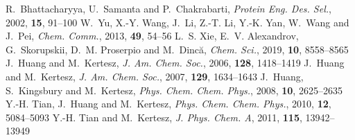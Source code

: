 \documentclass[twoside,twocolumn,9pt]{article}
\begin{document}
\begin{mcitethebibliography}{79}
\EndOfBibitem
{}
R.~Bhattacharyya, U.~Samanta and P.~Chakrabarti, \emph{Protein Eng. Des. Sel.},
  2002, \textbf{15}, 91--100\relax
\mciteBstWouldAddEndPuncttrue
\mciteSetBstMidEndSepPunct{\mcitedefaultmidpunct}
{\mcitedefaultendpunct}{\mcitedefaultseppunct}\relax
\EndOfBibitem
{}
W.~Yu, X.-Y. Wang, J.~Li, Z.-T. Li, Y.-K. Yan, W.~Wang and J.~Pei, \emph{Chem.
  Comm.}, 2013, \textbf{49}, 54--56\relax
\mciteBstWouldAddEndPuncttrue
\mciteSetBstMidEndSepPunct{\mcitedefaultmidpunct}
{\mcitedefaultendpunct}{\mcitedefaultseppunct}\relax
\EndOfBibitem
{}
L.~S. Xie, E.~V. Alexandrov, G.~Skorupskii, D.~M. Proserpio and M.~Dinc\u{a},
  \emph{Chem. Sci.}, 2019, \textbf{10}, 8558--8565\relax
\mciteBstWouldAddEndPuncttrue
\mciteSetBstMidEndSepPunct{\mcitedefaultmidpunct}
{\mcitedefaultendpunct}{\mcitedefaultseppunct}\relax
\EndOfBibitem
{}
J.~Huang and M.~Kertesz, \emph{J. Am. Chem. Soc.}, 2006, \textbf{128},
  1418--1419\relax
\mciteBstWouldAddEndPuncttrue
\mciteSetBstMidEndSepPunct{\mcitedefaultmidpunct}
{\mcitedefaultendpunct}{\mcitedefaultseppunct}\relax
\EndOfBibitem
{}
J.~Huang and M.~Kertesz, \emph{J. Am. Chem. Soc.}, 2007, \textbf{129},
  1634--1643\relax
\mciteBstWouldAddEndPuncttrue
\mciteSetBstMidEndSepPunct{\mcitedefaultmidpunct}
{\mcitedefaultendpunct}{\mcitedefaultseppunct}\relax
\EndOfBibitem
{}
J.~Huang, S.~Kingsbury and M.~Kertesz, \emph{Phys. Chem. Chem. Phys.}, 2008,
  \textbf{10}, 2625--2635\relax
\mciteBstWouldAddEndPuncttrue
\mciteSetBstMidEndSepPunct{\mcitedefaultmidpunct}
{\mcitedefaultendpunct}{\mcitedefaultseppunct}\relax
\EndOfBibitem
{}
Y.-H. Tian, J.~Huang and M.~Kertesz, \emph{Phys. Chem. Chem. Phys.}, 2010,
  \textbf{12}, 5084--5093\relax
\mciteBstWouldAddEndPuncttrue
\mciteSetBstMidEndSepPunct{\mcitedefaultmidpunct}
{\mcitedefaultendpunct}{\mcitedefaultseppunct}\relax
\EndOfBibitem
{}
Y.-H. Tian and M.~Kertesz, \emph{J. Phys. Chem. A}, 2011, \textbf{115},
  13942--13949\relax
\mciteBstWouldAddEndPuncttrue
\mciteSetBstMidEndSepPunct{\mcitedefaultmidpunct}
{\mcitedefaultendpunct}{\mcitedefaultseppunct}\relax

\end{mcitethebibliography}
\end{document}
